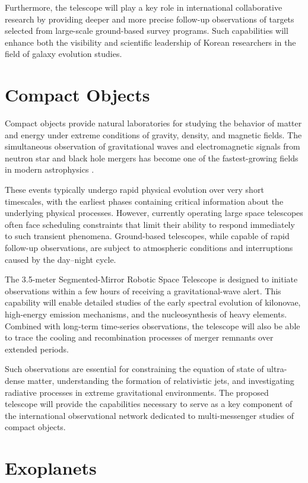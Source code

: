 Furthermore, the telescope will play a key role in international collaborative research by providing deeper and more precise follow-up observations of targets selected from large-scale ground-based survey programs. Such capabilities will enhance both the visibility and scientific leadership of Korean researchers in the field of galaxy evolution studies.

\section{Compact Objects}

Compact objects provide natural laboratories for studying the behavior of matter and energy under extreme conditions of gravity, density, and magnetic fields. The simultaneous observation of gravitational waves and electromagnetic signals from neutron star and black hole mergers has become one of the fastest-growing fields in modern astrophysics \cite{abbott2017}.

These events typically undergo rapid physical evolution over very short timescales, with the earliest phases containing critical information about the underlying physical processes. However, currently operating large space telescopes often face scheduling constraints that limit their ability to respond immediately to such transient phenomena. Ground-based telescopes, while capable of rapid follow-up observations, are subject to atmospheric conditions and interruptions caused by the day--night cycle.

The 3.5-meter Segmented-Mirror Robotic Space Telescope is designed to initiate observations within a few hours of receiving a gravitational-wave alert. This capability will enable detailed studies of the early spectral evolution of kilonovae, high-energy emission mechanisms, and the nucleosynthesis of heavy elements. Combined with long-term time-series observations, the telescope will also be able to trace the cooling and recombination processes of merger remnants over extended periods.

Such observations are essential for constraining the equation of state of ultra-dense matter, understanding the formation of relativistic jets, and investigating radiative processes in extreme gravitational environments. The proposed telescope will provide the capabilities necessary to serve as a key component of the international observational network dedicated to multi-messenger studies of compact objects.

\section{Exoplanets}

